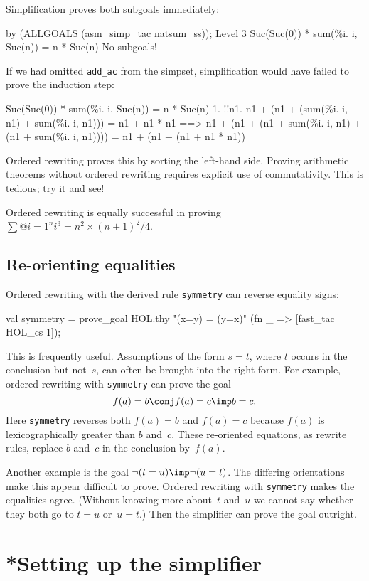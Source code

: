 Simplification proves both subgoals immediately:
\begin{ttbox}
by (ALLGOALS (asm_simp_tac natsum_ss));
{\out Level 3}
{\out Suc(Suc(0)) * sum(\%i. i, Suc(n)) = n * Suc(n)}
{\out No subgoals!}
\end{ttbox}
If we had omitted {\tt add_ac} from the simpset, simplification would have
failed to prove the induction step:
\begin{ttbox}
Suc(Suc(0)) * sum(\%i. i, Suc(n)) = n * Suc(n)
 1. !!n1. n1 + (n1 + (sum(\%i. i, n1) + sum(\%i. i, n1))) =
          n1 + n1 * n1 ==>
          n1 + (n1 + (n1 + sum(\%i. i, n1) + (n1 + sum(\%i. i, n1)))) =
          n1 + (n1 + (n1 + n1 * n1))
\end{ttbox}
Ordered rewriting proves this by sorting the left-hand side.  Proving
arithmetic theorems without ordered rewriting requires explicit use of
commutativity.  This is tedious; try it and see!

Ordered rewriting is equally successful in proving
$\sum@{i=1}^n i^3 = n^2\times(n+1)^2/4$.


\subsection{Re-orienting equalities}
Ordered rewriting with the derived rule {\tt symmetry} can reverse equality
signs:
\begin{ttbox}
val symmetry = prove_goal HOL.thy "(x=y) = (y=x)"
                 (fn _ => [fast_tac HOL_cs 1]);
\end{ttbox}
This is frequently useful.  Assumptions of the form $s=t$, where $t$ occurs
in the conclusion but not~$s$, can often be brought into the right form.
For example, ordered rewriting with {\tt symmetry} can prove the goal
\[ f(a)=b \conj f(a)=c \imp b=c. \]
Here {\tt symmetry} reverses both $f(a)=b$ and $f(a)=c$
because $f(a)$ is lexicographically greater than $b$ and~$c$.  These
re-oriented equations, as rewrite rules, replace $b$ and~$c$ in the
conclusion by~$f(a)$. 

Another example is the goal $\neg(t=u) \imp \neg(u=t)$.
The differing orientations make this appear difficult to prove.  Ordered
rewriting with {\tt symmetry} makes the equalities agree.  (Without
knowing more about~$t$ and~$u$ we cannot say whether they both go to $t=u$
or~$u=t$.)  Then the simplifier can prove the goal outright.



\section{*Setting up the simplifier}\label{sec:setting-up-simp}

